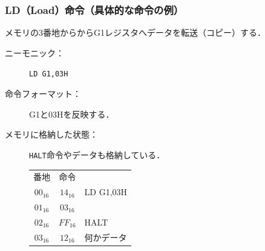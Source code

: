 \documentclass{beamer}                 %
\begin{document}
\begin{frame}
  \frametitle{LD（Load）命令（具体的な命令の例）}
  メモリの3番地からからG1レジスタへデータを転送（コピー）する．

  \begin{description}
  \item[ニーモニック：] \texttt{LD G1,03H}

  \item[命令フォーマット：] G1と03Hを反映する．\\
    \vspace{1.0cm}

  \item[メモリに格納した状態：]\texttt{HALT}命令やデータも格納している．
    {\ttfamily\small\begin{center}
      \begin{tabular}{c|c|l}
        \multicolumn{1}{c}{番地} &
        \multicolumn{1}{c}{命令} &
        \multicolumn{1}{c}{}  \\
        \cline{2-2}
        $00_{16}$ & $14_{16}$ & LD G1,03H  \\
        \cline{2-2}
        $01_{16}$ & $03_{16}$ &            \\
        \cline{2-2}
        $02_{16}$ & $FF_{16}$ & HALT       \\
        \cline{2-2}
        $03_{16}$ & $12_{16}$ & 何かデータ \\
        \cline{2-2}
      \end{tabular}
    \end{center}}
  \end{description}
\end{frame}
\end{document}
